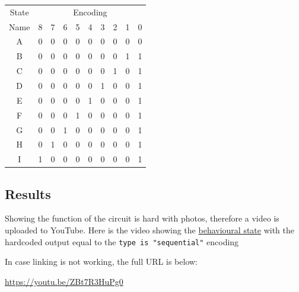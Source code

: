 \documentclass{article}
\begin{document}
\begin{table}[htbp]
  \centering
    \begin{tabular}{|c|c|c|c|c|c|c|c|c|c|}
    \hline
    State & \multicolumn{9}{c|}{Encoding} \bigstrut\\
\cline{2-10}    Name  & 8     & 7     & 6     & 5     & 4     & 3     & 2     & 1     & 0 \bigstrut\\
    \hline
    A     & 0     & 0     & 0     & 0     & 0     & 0     & 0     & 0     & 0 \bigstrut\\
    \hline
    B     & 0     & 0     & 0     & 0     & 0     & 0     & 0     & 1     & 1 \bigstrut\\
    \hline
    C     & 0     & 0     & 0     & 0     & 0     & 0     & 1     & 0     & 1 \bigstrut\\
    \hline
    D     & 0     & 0     & 0     & 0     & 0     & 1     & 0     & 0     & 1 \bigstrut\\
    \hline
    E     & 0     & 0     & 0     & 0     & 1     & 0     & 0     & 0     & 1 \bigstrut\\
    \hline
    F     & 0     & 0     & 0     & 1     & 0     & 0     & 0     & 0     & 1 \bigstrut\\
    \hline
    G     & 0     & 0     & 1     & 0     & 0     & 0     & 0     & 0     & 1 \bigstrut\\
    \hline
    H     & 0     & 1     & 0     & 0     & 0     & 0     & 0     & 0     & 1 \bigstrut\\
    \hline
    I     & 1     & 0     & 0     & 0     & 0     & 0     & 0     & 0     & 1 \bigstrut\\
    \hline
    \end{tabular}%
  \label{tab:out_oh}%
\end{table}%

\clearpage
\subsection{Results}
Showing the function of the circuit is hard with photos, therefore a video is uploaded to YouTube. Here is the video showing the \href{https://youtu.be/ZBt7R3HuPg0}{behavioural state} with the hardcoded output equal to the \verb|type is "sequential"| encoding\par
In case linking is not working, the full URL is below: \par
\url{https://youtu.be/ZBt7R3HuPg0}
\end{document}
